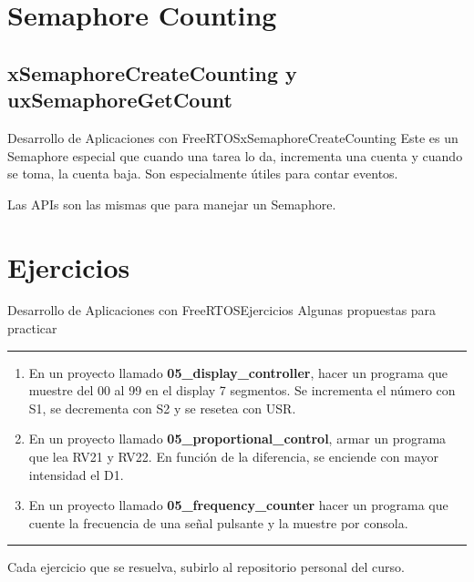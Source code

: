 \documentclass[aspectratio=169, xcolor=dvipsnames]{beamer}
\begin{document}
\section{Semaphore Counting}
\subsection{xSemaphoreCreateCounting y uxSemaphoreGetCount}
\begin{frame}{Desarrollo de Aplicaciones con FreeRTOS}{xSemaphoreCreateCounting}
Este es un Semaphore especial que cuando una tarea lo da, incrementa una cuenta y cuando se toma, la cuenta baja.\newline
Son especialmente útiles para contar eventos.\newline

Las APIs son las mismas que para manejar un Semaphore.
\end{frame}

\section{Ejercicios}
\begin{frame}{Desarrollo de Aplicaciones con FreeRTOS}{Ejercicios}
    Algunas propuestas para practicar
    \noindent\rule{\textwidth}{0.75pt}
    \begin{enumerate}
        \item En un proyecto llamado \textbf{05\_display\_controller}, hacer un programa que muestre del 00 al 99 en el display 7 segmentos. Se incrementa el número con S1, se decrementa con S2 y se resetea con USR.
        \item En un proyecto llamado \textbf{05\_proportional\_control}, armar un programa que lea RV21 y RV22. En función de la diferencia, se enciende con mayor intensidad el D1.
        \item En un proyecto llamado \textbf{05\_frequency\_counter} hacer un programa que cuente la frecuencia de una señal pulsante y la muestre por consola.
    \end{enumerate}
    \noindent\rule{\textwidth}{0.75pt}
    Cada ejercicio que se resuelva, subirlo al repositorio personal del curso.
\end{frame}
\end{document}
